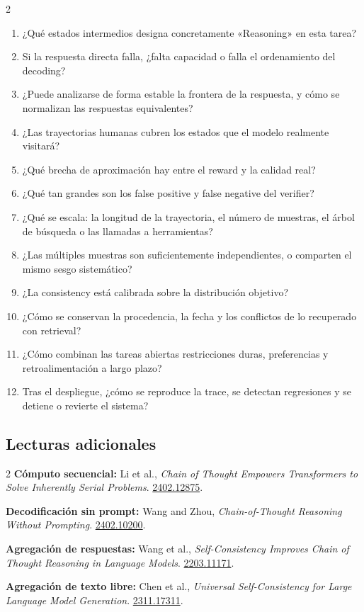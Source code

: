 \documentclass[a4paper]{article}
\begin{document}
\small
\begin{multicols}{2}
\begin{enumerate}
  \item ¿Qué estados intermedios designa concretamente «Reasoning» en esta tarea?
  \item Si la respuesta directa falla, ¿falta capacidad o falla el ordenamiento del decoding?
  \item ¿Puede analizarse de forma estable la frontera de la respuesta, y cómo se normalizan las respuestas equivalentes?
  \item ¿Las trayectorias humanas cubren los estados que el modelo realmente visitará?
  \item ¿Qué brecha de aproximación hay entre el reward y la calidad real?
  \item ¿Qué tan grandes son los false positive y false negative del verifier?
  \item ¿Qué se escala: la longitud de la trayectoria, el número de muestras, el árbol de búsqueda o las llamadas a herramientas?
  \item ¿Las múltiples muestras son suficientemente independientes, o comparten el mismo sesgo sistemático?
  \item ¿La consistency está calibrada sobre la distribución objetivo?
  \item ¿Cómo se conservan la procedencia, la fecha y los conflictos de lo recuperado con retrieval?
  \item ¿Cómo combinan las tareas abiertas restricciones duras, preferencias y retroalimentación a largo plazo?
  \item Tras el despliegue, ¿cómo se reproduce la trace, se detectan regresiones y se detiene o revierte el sistema?
\end{enumerate}
\end{multicols}
\normalsize

\subsection{Lecturas adicionales}

\scriptsize
\begin{multicols}{2}
\noindent\textbf{Cómputo secuencial: }Li et al., \emph{Chain of Thought Empowers Transformers to Solve Inherently Serial Problems}. \href{https://arxiv.org/abs/2402.12875}{2402.12875}.\par
\noindent\textbf{Decodificación sin prompt: }Wang and Zhou, \emph{Chain-of-Thought Reasoning Without Prompting}. \href{https://arxiv.org/abs/2402.10200}{2402.10200}.\par
\noindent\textbf{Agregación de respuestas: }Wang et al., \emph{Self-Consistency Improves Chain of Thought Reasoning in Language Models}. \href{https://arxiv.org/abs/2203.11171}{2203.11171}.\par
\noindent\textbf{Agregación de texto libre: }Chen et al., \emph{Universal Self-Consistency for Large Language Model Generation}. \href{https://arxiv.org/abs/2311.17311}{2311.17311}.\par
\end{multicols}
\normalsize
\end{document}
